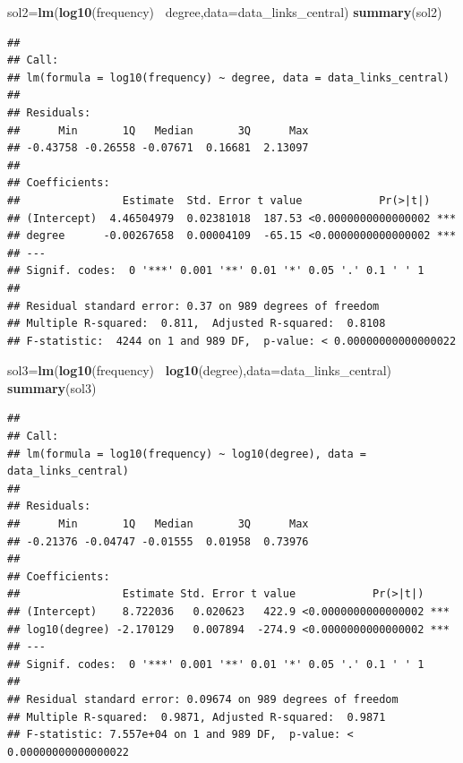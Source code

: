 \documentclass[
]{article}
\newenvironment{Shaded}{\begin{snugshade}}{\end{snugshade}}
\newcommand{\DataTypeTok}[1]{\textcolor[rgb]{0.13,0.29,0.53}{#1}}
\newcommand{\KeywordTok}[1]{\textcolor[rgb]{0.13,0.29,0.53}{\textbf{#1}}}
\newcommand{\NormalTok}[1]{#1}
\newcommand{\OperatorTok}[1]{\textcolor[rgb]{0.81,0.36,0.00}{\textbf{#1}}}
\newcommand{\StringTok}[1]{\textcolor[rgb]{0.31,0.60,0.02}{#1}}
\begin{document}
\begin{Shaded}
\begin{Highlighting}[]
\NormalTok{sol2=}\KeywordTok{lm}\NormalTok{(}\KeywordTok{log10}\NormalTok{(frequency)}\OperatorTok{~}\StringTok{ }\NormalTok{degree,}\DataTypeTok{data=}\NormalTok{data_links_central)}
\KeywordTok{summary}\NormalTok{(sol2)}
\end{Highlighting}
\end{Shaded}

\begin{verbatim}
## 
## Call:
## lm(formula = log10(frequency) ~ degree, data = data_links_central)
## 
## Residuals:
##      Min       1Q   Median       3Q      Max 
## -0.43758 -0.26558 -0.07671  0.16681  2.13097 
## 
## Coefficients:
##                Estimate  Std. Error t value            Pr(>|t|)    
## (Intercept)  4.46504979  0.02381018  187.53 <0.0000000000000002 ***
## degree      -0.00267658  0.00004109  -65.15 <0.0000000000000002 ***
## ---
## Signif. codes:  0 '***' 0.001 '**' 0.01 '*' 0.05 '.' 0.1 ' ' 1
## 
## Residual standard error: 0.37 on 989 degrees of freedom
## Multiple R-squared:  0.811,  Adjusted R-squared:  0.8108 
## F-statistic:  4244 on 1 and 989 DF,  p-value: < 0.00000000000000022
\end{verbatim}

\begin{Shaded}
\begin{Highlighting}[]
\NormalTok{sol3=}\KeywordTok{lm}\NormalTok{(}\KeywordTok{log10}\NormalTok{(frequency)}\OperatorTok{~}\StringTok{ }\KeywordTok{log10}\NormalTok{(degree),}\DataTypeTok{data=}\NormalTok{data_links_central)}
\KeywordTok{summary}\NormalTok{(sol3)}
\end{Highlighting}
\end{Shaded}

\begin{verbatim}
## 
## Call:
## lm(formula = log10(frequency) ~ log10(degree), data = data_links_central)
## 
## Residuals:
##      Min       1Q   Median       3Q      Max 
## -0.21376 -0.04747 -0.01555  0.01958  0.73976 
## 
## Coefficients:
##                Estimate Std. Error t value            Pr(>|t|)    
## (Intercept)    8.722036   0.020623   422.9 <0.0000000000000002 ***
## log10(degree) -2.170129   0.007894  -274.9 <0.0000000000000002 ***
## ---
## Signif. codes:  0 '***' 0.001 '**' 0.01 '*' 0.05 '.' 0.1 ' ' 1
## 
## Residual standard error: 0.09674 on 989 degrees of freedom
## Multiple R-squared:  0.9871, Adjusted R-squared:  0.9871 
## F-statistic: 7.557e+04 on 1 and 989 DF,  p-value: < 0.00000000000000022
\end{verbatim}
\end{document}
